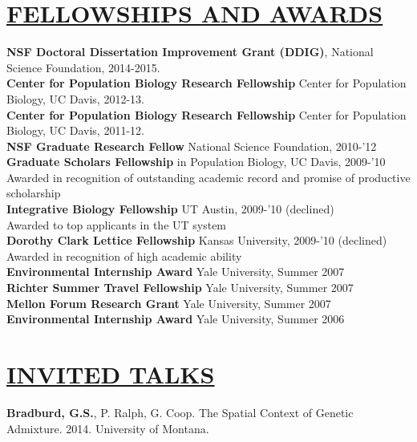 \documentclass{res}
\begin{document}
\begin{resume}
\section{\underline{FELLOWSHIPS AND AWARDS}}
\textbf{NSF Doctoral Dissertation Improvement Grant (DDIG)}, National Science Foundation, 2014-2015.\\
\textbf{Center for Population Biology Research Fellowship} Center for Population Biology, UC Davis, 2012-13.\\
\textbf{Center for Population Biology Research Fellowship} Center for Population Biology, UC Davis, 2011-12.\\
\textbf{NSF Graduate Research Fellow} National Science Foundation, 2010-'12\\ \vspace{0.3mm}
\textbf{Graduate Scholars Fellowship} in Population Biology, UC Davis, 2009-'10\\ \vspace{0.3mm}
\hspace{4.5mm}Awarded in recognition of outstanding academic record and promise of productive scholarship\\
\textbf{Integrative Biology Fellowship} UT Austin, 2009-'10 (declined)\\ \vspace{0.3mm}
\hspace{4.5mm}Awarded to top applicants in the UT system\\
\textbf{Dorothy Clark Lettice Fellowship} Kansas University, 2009-'10 (declined)\\  \vspace{0.3mm}
\hspace{4.5mm}Awarded in recognition of high academic ability\\
\textbf{Environmental Internship Award} Yale University, Summer 2007\\ 
\textbf{Richter Summer Travel Fellowship} Yale University, Summer 2007\\
\textbf{Mellon Forum Research Grant} Yale University, Summer 2007\\
\textbf{Environmental Internship Award} Yale University, Summer 2006\\

\section{\underline{INVITED TALKS}}

\textbf{Bradburd, G.S.}, P. Ralph, G. Coop. The Spatial Context of Genetic Admixture.  2014.  University of Montana.


\end{resume}
\end{document}
